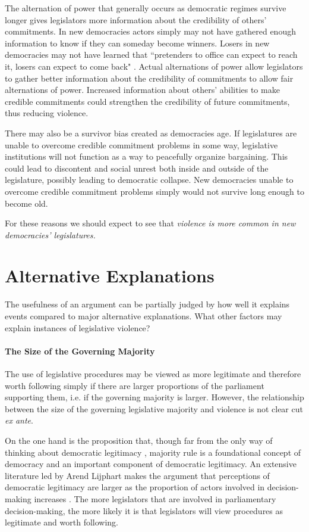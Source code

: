 \documentclass[a4paper]{article}\usepackage[]{graphicx}\usepackage[]{color}
\begin{document}
The alternation of power that generally occurs as democratic regimes survive longer gives legislators more information about the credibility of others' commitments. In new democracies actors simply may not have gathered enough information to know if they can someday become winners. Losers in new democracies may not have learned that ``pretenders to office can expect to reach it, losers can expect to come back" \citep[][36]{Przeworski1991}. Actual alternations of power allow legislators to gather better information about the credibility of commitments to allow fair alternations of power. Increased information about others' abilities to make credible commitments could strengthen the credibility of future commitments, thus reducing violence.

There may also be a survivor bias created as democracies age. If legislatures are unable to overcome credible commitment problems in some way, legislative institutions will not function as a way to peacefully organize bargaining. This could lead to discontent and social unrest both inside and outside of the legislature, possibly leading to democratic collapse. New democracies unable to overcome credible commitment problems simply would not survive long enough to become old.

For these reasons we should expect to see that \emph{violence is more common in new democracies' legislatures.}

\section{Alternative Explanations}

The usefulness of an argument can be partially judged by how well it explains events compared to major alternative explanations. What other factors may explain instances of legislative violence?

\paragraph{The Size of the Governing Majority}

The use of legislative procedures may be viewed as more legitimate and therefore worth following simply if there are larger proportions of the parliament supporting them, i.e. if the governing majority is larger. However, the relationship between the size of the governing legislative majority and violence is not clear cut \emph{ex ante}. 

On the one hand is the proposition that, though far from the only way of thinking about democratic legitimacy \cite[see][for a discussion]{Follesdal2006}, majority rule is a foundational concept of democracy \citep{Dahl1989} and an important component of democratic legitimacy. An extensive literature led by Arend Lijphart makes the argument that perceptions of democratic legitimacy are larger as the proportion of actors involved in decision-making increases \citep[see][]{Lijphart2007}. The more legislators that are involved in parliamentary decision-making, the more likely it is that legislators will view procedures as legitimate and worth following. 
\end{document}
